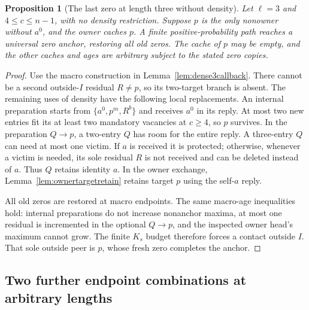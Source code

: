 \documentclass[11pt]{article}
\newtheorem{proposition}[theorem]{Proposition}
\begin{document}
\begin{proposition}[The last zero at length three without density]
\label{prop:nearcomplete3}
Let $\ell=3$ and $4\le c\le n-1$, with no density restriction.
Suppose $p$ is the only nonowner without $a^0$, and the owner
caches $p$. A finite positive-probability path reaches a
universal zero anchor, restoring all old zeros.
The cache of $p$ may be empty, and the other caches and ages
are arbitrary subject to the stated zero copies.
\end{proposition}
\begin{proof}
Use the macro construction in Lemma~\ref{lem:dense3callback}.
There cannot be a second outside-$I$ residual $R\ne p$,
so its two-target branch is absent.
The remaining uses of density have the following local
replacements. An internal preparation starts from
$\{a^0,p^m,R^b\}$ and receives $a^0$ in its reply.
At most two new entries fit its at least two mandatory
vacancies at $c\ge4$, so $p$ survives.
In the preparation $Q\to p$, a two-entry $Q$ has room
for the entire reply. A three-entry $Q$ can need at
most one victim. If $a$ is received it is protected;
otherwise, whenever a victim is needed, its sole
residual $R$ is not received and can be deleted
instead of $a$. Thus $Q$ retains identity $a$.
In the owner exchange, Lemma~\ref{lem:ownertargetretain}
retains target $p$ using the self-$a$ reply.

All old zeros are restored at macro endpoints.
The same macro-age inequalities hold: internal preparations
do not increase nonanchor maxima, at most one residual
is incremented in the optional $Q\to p$, and the inspected
owner head's maximum cannot grow. The finite $K_s$ budget
therefore forces a contact outside $I$. That sole outside
peer is $p$, whose fresh zero completes the anchor.
\end{proof}

\subsection{Two further endpoint combinations at arbitrary lengths}
\end{document}
